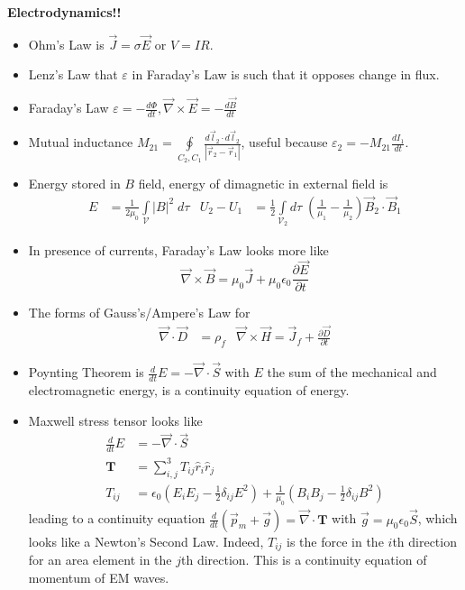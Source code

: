 \documentclass[10pt]{report}
\newcommand{\rd}[2]{\frac{d#1}{d#2}}
\newcommand{\pd}[2]{\frac{\partial #1}{\partial#2}}
\newcommand{\abs}[1]{\left|#1\right|}
\begin{document}
{\large
    \textbf{Electrodynamics!!}
}
\begin{itemize}
    \item Ohm's Law is $\vec{J} = \sigma \vec{E}$ or $V = IR$.
    \item Lenz's Law that $\varepsilon$ in Faraday's Law is such that it opposes change in flux.
    \item Faraday's Law $\varepsilon = -\rd{\Phi}{t}, \vec{\nabla} \times \vec{E} = -\rd{\vec{B}}{t}$
    \item Mutual inductance $M_{21} = \oint\limits_{C_2, C_1}\frac{d\vec{l}_2\cdot d\vec{l}_2}{\abs{\vec{r}_2 - \vec{r}_1}}$, useful because $\varepsilon_2 = -M_{21}\rd{I_1}{t}$.
    \item Energy stored in $B$ field, energy of dimagnetic in external field is
        \begin{align}
            E &= \frac{1}{2\mu_0}\int\limits_{\mathcal{V}}^{}\abs{B}^2\;d\tau & U_2 - U_1 &= \frac{1}{2}\int\limits_{\mathcal{V}_2}^{}d\tau\;\left( \frac{1}{\mu_1} - \frac{1}{\mu_2} \right)\vec{B}_2 \cdot \vec{B}_1
        \end{align}
    \item In presence of currents, Faraday's Law looks more like
        $$\vec{\nabla} \times \vec{B} = \mu_0 \vec{J} + \mu_0\epsilon_0 \pd{\vec{E}}{t}$$
    \item The forms of Gauss's/Ampere's Law for 
        \begin{align}
            \vec{\nabla} \cdot \vec{D} &= \rho_f & \vec{\nabla} \times \vec{H} = \vec{J}_f + \pd{\vec{D}}{t}
        \end{align}
    \item Poynting Theorem is $\rd{}{t} E = -\vec{\nabla} \cdot \vec{S}$ with $E$ the sum of the mechanical and electromagnetic energy, is a continuity equation of energy.
    \item Maxwell stress tensor looks like
        \begin{align}
            \rd{}{t} E &= -\vec{\nabla} \cdot \vec{S}\\
            \mathbf{T} &= \sum_{i,j}^{3}T_{ij}\hat{r}_i \hat{r}_j \\
            T_{ij} &= \epsilon_0\left( E_iE_j - \frac{1}{2}\delta_{ij}E^2 \right) + \frac{1}{\mu_0}\left( B_i B_j - \frac{1}{2}\delta_{ij}B^2 \right)
        \end{align}
        leading to a continuity equation $\rd{}{t}\left( \vec{p}_m + \vec{g} \right) = \vec{\nabla} \cdot \mathbf{T}$ with $\vec{g} = \mu_0 \epsilon_0 \vec{S}$, which looks like a Newton's Second Law. Indeed, $T_{ij}$ is the force in the $i$th direction for an area element in the $j$th direction. This is a continuity equation of momentum of EM waves.

\end{itemize}
\end{document}
